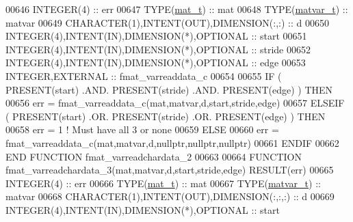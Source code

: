 \begin{DoxyCode}
00646     \textcolor{keywordtype}{INTEGER(4)}                                  :: err
00647     \textcolor{keywordtype}{TYPE}(\hyperlink{group___m_a_t_gab0fc888f5a5d79943b16284b1f91c2e8}{mat\_t})                                 :: mat
00648     \textcolor{keywordtype}{TYPE}(\hyperlink{group___m_a_t_structmatvar__t}{matvar\_t})                              :: matvar
00649     \textcolor{keywordtype}{CHARACTER(1)},\textcolor{keywordtype}{INTENT(OUT)},\textcolor{keywordtype}{DIMENSION(:,:)}     :: d
00650     \textcolor{keywordtype}{INTEGER(4)},\textcolor{keywordtype}{INTENT(IN)},\textcolor{keywordtype}{DIMENSION(*)},\textcolor{keywordtype}{OPTIONAL} :: start
00651     \textcolor{keywordtype}{INTEGER(4)},\textcolor{keywordtype}{INTENT(IN)},\textcolor{keywordtype}{DIMENSION(*)},\textcolor{keywordtype}{OPTIONAL} :: stride
00652     \textcolor{keywordtype}{INTEGER(4)},\textcolor{keywordtype}{INTENT(IN)},\textcolor{keywordtype}{DIMENSION(*)},\textcolor{keywordtype}{OPTIONAL} :: edge
00653     \textcolor{keywordtype}{INTEGER},\textcolor{keywordtype}{EXTERNAL}                            :: fmat\_varreaddata\_c
00654 
00655     \textcolor{keywordflow}{IF} ( \textcolor{keyword}{PRESENT}(start) .AND. \textcolor{keyword}{PRESENT}(stride) .AND. \textcolor{keyword}{PRESENT}(edge) ) \textcolor{keywordflow}{THEN}
00656         err = fmat\_varreaddata\_c(mat,matvar,d,start,stride,edge)
00657     \textcolor{keywordflow}{ELSEIF} ( \textcolor{keyword}{PRESENT}(start) .OR. \textcolor{keyword}{PRESENT}(stride) .OR. \textcolor{keyword}{PRESENT}(edge) ) \textcolor{keywordflow}{THEN}
00658         err = 1    \textcolor{comment}{! Must have all 3 or none}
00659     \textcolor{keywordflow}{ELSE}
00660         err = fmat\_varreaddata\_c(mat,matvar,d,nullptr,nullptr,nullptr)
00661 \textcolor{keywordflow}{    ENDIF}
00662 \textcolor{keyword}{END FUNCTION }fmat\_varreadchardata\_2
00663 
00664 \textcolor{keyword}{FUNCTION }fmat\_varreadchardata\_3(mat,matvar,d,start,stride,edge) \textcolor{keyword}{RESULT}(err)
00665     \textcolor{keywordtype}{INTEGER(4)}                                  :: err
00666     \textcolor{keywordtype}{TYPE}(\hyperlink{group___m_a_t_gab0fc888f5a5d79943b16284b1f91c2e8}{mat\_t})                                 :: mat
00667     \textcolor{keywordtype}{TYPE}(\hyperlink{group___m_a_t_structmatvar__t}{matvar\_t})                              :: matvar
00668     \textcolor{keywordtype}{CHARACTER(1)},\textcolor{keywordtype}{INTENT(OUT)},\textcolor{keywordtype}{DIMENSION(:,:,:)}   :: d
00669     \textcolor{keywordtype}{INTEGER(4)},\textcolor{keywordtype}{INTENT(IN)},\textcolor{keywordtype}{DIMENSION(*)},\textcolor{keywordtype}{OPTIONAL} :: start

\end{DoxyCode}
